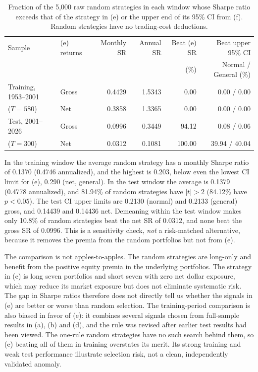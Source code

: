 \begin{table}[htbp]
\centering\small
\caption{Fraction of the 5,000 raw random strategies in each window whose Sharpe ratio exceeds that of the strategy in (e) or the upper end of its 95\% CI from (f). Random strategies have no trading-cost deductions.}
\label{tab:gcompare}
\begin{tabular}{llrrrr}
\toprule
Sample & (e) returns & Monthly SR & Annual SR & Beat (e) SR & Beat upper 95\% CI\\
 & & & & (\%) & Normal / General (\%)\\
\midrule
Training, 1953--2001 & Gross & 0.4429 & 1.5343 & 0.00 & 0.00 / 0.00\\
($T=580$) & Net & 0.3858 & 1.3365 & 0.00 & 0.00 / 0.00\\
\addlinespace
Test, 2001--2026 & Gross & 0.0996 & 0.3449 & 94.12 & 0.08 / 0.06\\
($T=300$) & Net & 0.0312 & 0.1081 & 100.00 & 39.94 / 40.04\\
\bottomrule
\end{tabular}
\end{table}

In the training window the average random strategy has a monthly Sharpe ratio
of 0.1370 (0.4746 annualized), and the highest is 0.203, below even the lowest
CI limit for (e), 0.290 (net, general). In the test window the average is
0.1379 (0.4778 annualized), and 81.94\% of random strategies have $|t|>2$
(84.12\% have $p<0.05$). The test CI upper limits are 0.2130 (normal) and
0.2133 (general) gross, and 0.14439 and 0.14436 net. Demeaning within the test
window makes only 10.8\% of random strategies beat the net SR of 0.0312, and
none beat the gross SR of 0.0996. This is a sensitivity check, \emph{not} a
risk-matched alternative, because it removes the premia from the random
portfolios but not from (e).

The comparison is not apples-to-apples. The random strategies are long-only
and benefit from the positive equity premia in the underlying portfolios.
The strategy in (e) is long seven portfolios and short seven with zero net
dollar exposure, which may reduce its market exposure but does not eliminate
systematic risk. The gap in Sharpe ratios therefore does not directly tell us whether the signals in (e)
are better or worse than random selection. The training-period comparison
is also biased in favor of (e): it combines several signals chosen from
full-sample results in (a), (b) and (d), and the rule was revised after earlier
test results had been viewed. The one-rule random strategies have no such
search behind them, so (e) beating all of them in training overstates its
merit. Its strong training and weak test performance illustrate selection
risk, not a clean, independently validated anomaly.

